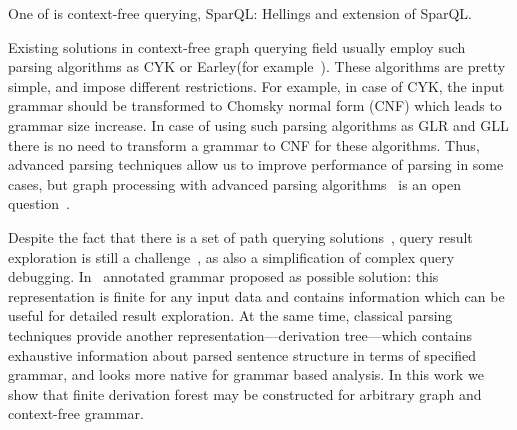 \documentclass[runningheads,a4paper]{llncs}
\begin{document}
One of is context-free querying, SparQL: Hellings and extension of SparQL.

Existing solutions in context-free graph querying field usually employ such parsing algorithms as CYK or Earley(for example~\cite{ConjCFPathQuery,CFGonRDF,GraphQueryWithEarley}). 
These algorithms are pretty simple, and impose different restrictions.
For example, in case of CYK, the input grammar should be transformed to Chomsky normal form (CNF) which leads to grammar size increase.
In case of using such parsing algorithms as GLR and GLL there is no need to transform a grammar to CNF for these algorithms.
Thus, advanced parsing techniques allow us to improve performance of parsing in some cases, but graph processing with advanced parsing algorithms~\cite{Grune} is an open question~\cite{Hellings16}.

Despite the fact that there is a set of path querying solutions~\cite{GraphQueryWithEarley,ConjCFPathQuery,QueryGraphWithData,RegularDBQuery}, query result exploration is still a challenge~\cite{hofman2015separabilityForRegQueryDebugging}, as also a simplification of complex query debugging.
In~\cite{Hellings16} annotated grammar proposed as possible solution: this representation is finite for any input data and contains information which can be useful for detailed result exploration.
At the same time, classical parsing techniques provide another representation---derivation tree---which contains exhaustive information about parsed sentence structure in terms of specified grammar, and looks more native for grammar based analysis.
In this work we show that finite derivation forest may be constructed for arbitrary graph and context-free grammar.



\end{document}
